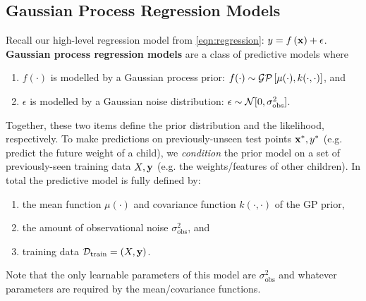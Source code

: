 \subsection{Gaussian Process Regression Models}
\label{sec:gp_models}

Recall our high-level regression model from \cref{eqn:regression}: $y = f \left( \mathbf{x} \right) + \epsilon$.
{\bf Gaussian process regression models} are a class of predictive models where
%
\begin{enumerate}
  \item $f ( \cdot )$ is modelled by a Gaussian process prior: $f (\cdot) \sim \mathcal{GP} \left[ \mu(\cdot), k(\cdot, \cdot) \right]$, and
  \item $\epsilon$ is modelled by a Gaussian noise distribution: $\epsilon \sim \normaldist{0}{\sigma_\text{obs}^2}$.
\end{enumerate}
%
Together, these two items define the prior distribution and the likelihood, respectively.
To make predictions on previously-unseen test points $\mathbf{x}^*, y^*$ (e.g. predict the future weight of a child), we \emph{condition} the prior model on a set of previously-seen training data $X, \mathbf{y}$ (e.g. the weights/features of other children).
In total the predictive model is fully defined by:
\begin{enumerate}
  \item the mean function $\mu(\cdot)$ and covariance function $k(\cdot, \cdot)$ of the GP prior,
  \item the amount of observational noise $\sigma_\text{obs}^2$, and
  \item training data $\mathcal D_\text{train} = (X, \mathbf{y})$.
\end{enumerate}
%
Note that the only learnable parameters of this model are $\sigma_\text{obs}^2$ and whatever parameters are required by the mean/covariance functions.

